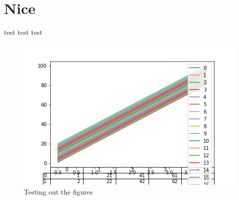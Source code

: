 \chapter{Nice}
test test test \cite{gijonmanchenoMappingMangroveOpportunities2021}





\begin{figure}[htbp]
  \centering
  \includegraphics[]{figures/testfig.png}
  \caption{Testing out the figures}
  \label{testfig}
\end{figure}